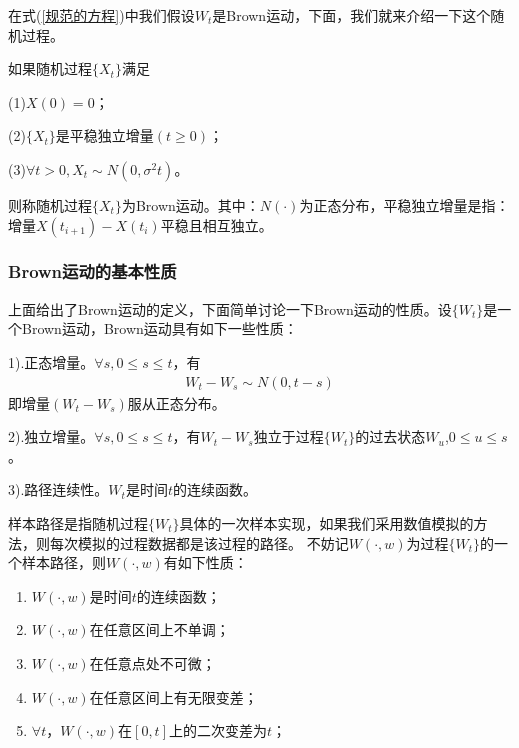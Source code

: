             \par
            在式(\ref{规范的方程})中我们假设$W_t$是Brown运动，下面，我们就来介绍一下这个随机过程。
            \begin{definition}[Brown运动]
            如果随机过程$\{X_t\}$满足\par
            (1)$X(0) = 0$；\par
            (2)$\{X_t\}$是平稳独立增量$(t \geqslant 0)$；\par
            (3)$\forall t > 0,X_t \sim N(0,\sigma^2t)$。\par
            则称随机过程$\{X_t\}$为Brown运动。其中：$ N(\cdot)$为正态分布，平稳独立增量是指：增量$X(t_{i+1}) - X(t_i)$平稳且相互独立。
            \end{definition}

        \subsubsection{Brown运动的基本性质}
            \label{subsubsec:Brown运动的基本性质}
            \par
            上面给出了Brown运动的定义，下面简单讨论一下Brown运动的性质。设$\{W_t\}$是一个Brown运动，Brown运动具有如下一些性质：\par
            1).正态增量。$\forall s, 0 \leqslant s \leqslant t$，有
            \begin{align*}
                W_t - W_s \sim N(0, t-s)
            \end{align*}
            即增量$(W_t - W_s)$服从正态分布。\par
            2).独立增量。$\forall s, 0 \leqslant s \leqslant t$，有$W_t - W_s$独立于过程$\{W_t\}$的过去状态$W_u$,$0 \leqslant u \leqslant s$。\par
            3).路径连续性。$W_t$是时间$t$的连续函数。
            \par
            样本路径是指随机过程$\{W_t\}$具体的一次样本实现，如果我们采用数值模拟的方法，则每次模拟的过程数据都是该过程的路径。
            不妨记$W(\cdot,w)$为过程$\{W_t\}$的一个样本路径，则$W(\cdot,w)$有如下性质：
            \begin{enumerate}
            \item $W(\cdot,w)$是时间$t$的连续函数；
            \item $W(\cdot,w)$在任意区间上不单调；
            \item $W(\cdot,w)$在任意点处不可微；
            \item $W(\cdot,w)$在任意区间上有无限变差；
            \item $\forall t$，$W(\cdot,w)$在$[0,t]$上的二次变差为$t$；
            \end{enumerate}
